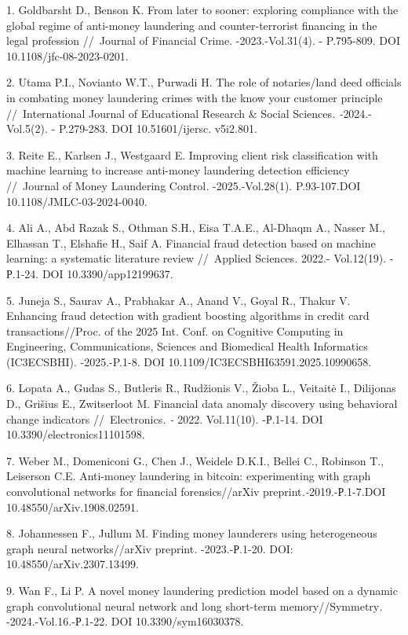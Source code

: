 \begin{refs}
1. Goldbarsht D., Benson K. From later to sooner: exploring compliance
with the global regime of anti-money laundering and counter-terrorist
financing in the legal profession //~Journal of Financial Crime.
-2023.-Vol.31(4). - P.795-809. DOI 10.1108/jfc-08-2023-0201.

2. Utama P.I., Novianto W.T., Purwadi H. The role of notaries/land deed
officials in combating money laundering crimes with the know your
customer principle //~International Journal of Educational Research \&
Social Sciences\emph{. -}2024.-Vol.5(2). - P.279-283. DOI
10.51601/ijersc. v5i2.801.

3. Reite E., Karlsen J., Westgaard E. Improving client risk
classification with machine learning to increase anti-money laundering
detection efficiency //~Journal of Money Laundering Control\emph{.}
-2025.-Vol.28(1). P.93-107.DOI 10.1108/JMLC-03-2024-0040.

4. Ali A., Abd Razak S., Othman S.H., Eisa T.A.E., Al-Dhaqm A., Nasser
M., Elhassan T., Elshafie H., Saif A. Financial fraud detection based
on machine learning: a systematic literature review //~Applied
Sciences\emph{.} 2022.- Vol.12(19). - Р.1-24. DOI 10.3390/app12199637.

5. Juneja S., Saurav A., Prabhakar A., Anand V., Goyal R., Thakur V.
Enhancing fraud detection with gradient boosting algorithms in credit
card transactions//Proc. of the 2025 Int. Conf. on Cognitive Computing
in Engineering, Communications, Sciences and Biomedical Health
Informatics (IC3ECSBHI). -2025.-P.1-8. DOI
10.1109/IC3ECSBHI63591.2025.10990658.

6. Lopata A., Gudas S., Butleris R., Rudžionis V., Žioba L., Veitaitė I.,
Dilijonas D., Grišius E., Zwitserloot M. Financial data anomaly
discovery using behavioral change indicators //~Electronics\emph{. -}
2022. Vol.11(10). -Р.1-14. DOI 10.3390/electronics11101598.

7. Weber M., Domeniconi G., Chen J., Weidele D.K.I., Bellei C., Robinson
T., Leiserson C.E. Anti-money laundering in bitcoin: experimenting
with graph convolutional networks for financial forensics//arXiv
preprint\emph{.-}2019.-Р.1-7.DOI 10.48550/arXiv.1908.02591.

8. Johannessen F., Jullum M. Finding money launderers using heterogeneous
graph neural networks//arXiv preprint\emph{.} -2023.-Р.1-20. DOI:
10.48550/arXiv.2307.13499.

9. Wan F., Li P. A novel money laundering prediction model based on a
dynamic graph convolutional neural network and long short-term
memory//Symmetry\emph{.} -2024.-Vol.16.-Р.1-22. DOI
10.3390/sym16030378.


\end{refs}
